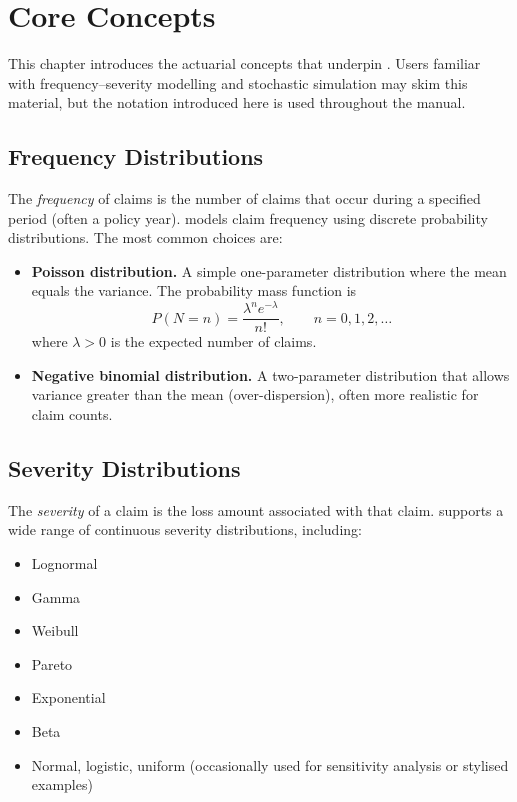 \chapter{Core Concepts}
\label{chap:core_concepts}

This chapter introduces the actuarial concepts that underpin \actsim. Users
familiar with frequency--severity modelling and stochastic simulation may
skim this material, but the notation introduced here is used throughout the
manual.

\section{Frequency Distributions}
\label{sec:frequency_distributions}

The \emph{frequency} of claims is the number of claims that occur during a
specified period (often a policy year). \actsim models claim frequency
using discrete probability distributions. The most common choices are:

\begin{itemize}[leftmargin=*]
    \item \textbf{Poisson distribution.} A simple one-parameter distribution
          where the mean equals the variance. The probability mass
          function is
          \[
              P(N = n) = \frac{\lambda^{n} e^{-\lambda}}{n!},
              \qquad n = 0, 1, 2, \dots
          \]
          where $\lambda > 0$ is the expected number of claims.
    \item \textbf{Negative binomial distribution.} A two-parameter
          distribution that allows variance greater than the mean
          (over-dispersion), often more realistic for claim counts.
\end{itemize}

\section{Severity Distributions}
\label{sec:severity_distributions}

The \emph{severity} of a claim is the loss amount associated with that
claim. \actsim supports a wide range of continuous severity distributions,
including:

\begin{itemize}[leftmargin=*]
    \item Lognormal
    \item Gamma
    \item Weibull
    \item Pareto
    \item Exponential
    \item Beta
    \item Normal, logistic, uniform (occasionally used for sensitivity
          analysis or stylised examples)
\end{itemize}


